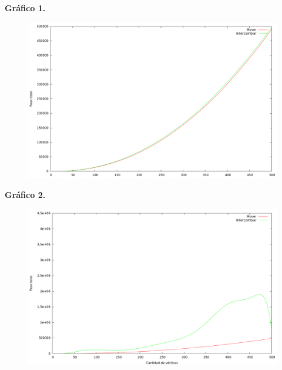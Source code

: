 \textbf{Gráfico 1.}
\begin{figure}[H]
  \begin{center}
    \includegraphics[scale=0.35]{imagenes/local-goloso-n-peso.png}
  \end{center}
\end{figure}

\newpage

\textbf{Gráfico 2.}
\begin{figure}[H]
  \begin{center}
    \includegraphics[scale=0.35]{imagenes/local-random-n-peso.png}
  \end{center}
\end{figure}

\vspace*{0.5cm}

